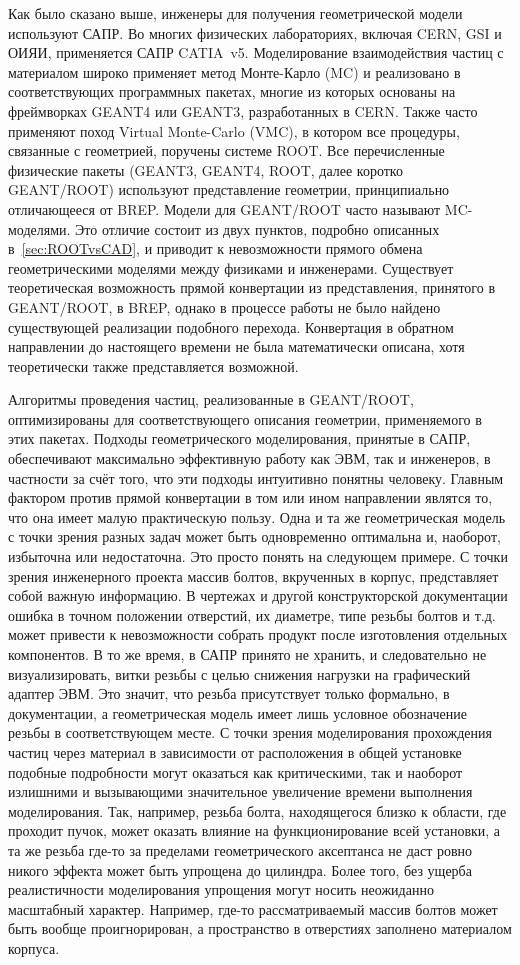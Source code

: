 Как было сказано выше, инженеры для получения геометрической модели используют САПР. Во многих физических лабораториях, включая CERN, GSI и ОИЯИ, применяется САПР CATIA~v5. Моделирование взаимодействия частиц с материалом широко применяет метод Монте-Карло (MC) и реализовано в соответствующих программных пакетах, многие из которых основаны на фреймворках GEANT4 или GEANT3, разработанных в CERN. Также часто применяют поход Virtual Monte-Carlo (VMC), в котором все процедуры, связанные с геометрией, поручены системе ROOT. Все перечисленные физические пакеты (GEANT3, GEANT4, ROOT, далее коротко GEANT/ROOT) используют представление геометрии, принципиально отличающееся от BREP. Модели для GEANT/ROOT часто называют  MC-моделями. Это отличие состоит из двух пунктов, подробно описанных в~\ref{sec:ROOTvsCAD}, и приводит к невозможности прямого обмена геометрическими моделями между физиками и инженерами. Существует теоретическая возможность прямой конвертации из представления, принятого в GEANT/ROOT, в BREP, однако в процессе работы не было найдено существующей реализации подобного перехода. Конвертация в обратном направлении до настоящего времени не была математически описана, хотя теоретически также представляется возможной.

Алгоритмы проведения частиц, реализованные в GEANT/ROOT, оптимизированы для соответствующего описания геометрии, применяемого в этих пакетах. Подходы геометрического моделирования, принятые в САПР, обеспечивают максимально эффективную работу как ЭВМ, так и инженеров, в частности за счёт того, что эти подходы интуитивно понятны человеку. Главным фактором против прямой конвертации в том или ином направлении являтся то, что она имеет малую практическую пользу. Одна и та же геометрическая модель с точки зрения разных задач может быть одновременно оптимальна и, наоборот, избыточна или недостаточна. Это просто понять на следующем примере. С точки зрения инженерного проекта массив болтов, вкрученных в корпус, представляет собой важную информацию. В чертежах и другой конструкторской документации ошибка в точном положении отверстий, их диаметре, типе резьбы болтов и т.д. может привести к невозможности собрать продукт после изготовления отдельных компонентов. В то же время, в САПР принято не хранить, и следовательно не визуализировать, витки резьбы с целью снижения нагрузки на графический адаптер ЭВМ. Это значит, что резьба присутствует только формально, в документации, а геометрическая модель имеет лишь условное обозначение резьбы в соответствующем месте. С точки зрения моделирования прохождения частиц через материал в зависимости от расположения в общей установке подобные подробности могут оказаться как критическими, так и наоборот излишними и вызывающими значительное увеличение времени выполнения моделирования. Так, например, резьба болта, находящегося близко к области, где проходит пучок, может оказать влияние на функционирование всей установки, а та же резьба где-то за пределами геометрического аксептанса не даст ровно никого эффекта может быть упрощена до цилиндра. Более того, без ущерба реалистичности моделирования упрощения могут носить неожиданно масштабный характер. Например, где-то рассматриваемый массив болтов может быть вообще проигнорирован, а пространство в отверстиях заполнено материалом корпуса.

